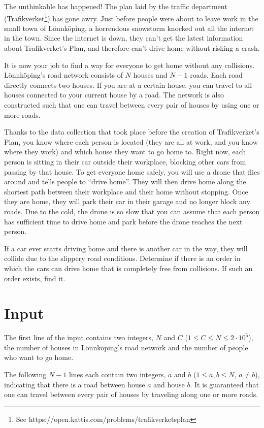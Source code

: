 \noindent
The unthinkable has happened! The plan laid by the traffic department (Trafikverket\footnote{See https://open.kattis.com/problems/trafikverketsplan}) has gone awry. Just before people were about to leave work in the small town of Lönnköping,
a horrendous snowstorm knocked out all the internet in the town. Since the internet is down, they can't get the latest
information about Trafikverket's Plan, and therefore can't drive home without risking a crash.

It is now your job to find a way for everyone to get home without any collisions. Lönnköping's road network consists
of $N$ houses and $N-1$ roads. Each road directly connects two houses. If you are at a certain house, you can
travel to all houses connected to your current house by a road. The network is also constructed such that one can
travel between every pair of houses by using one or more roads.

Thanks to the data collection that took place before the creation of Trafikverket's Plan, you know where each person
is located (they are all at work, and you know where they work) and which house they want to go home to.
Right now, each person is sitting in their car outside their workplace, blocking other cars from passing by that house.
To get everyone home safely, you will use a drone that flies around and tells people to ``drive home''. They will then
drive home along the shortest path between their workplace and their home without stopping. Once they are home,
they will park their car in their garage and no longer block any roads. Due to the cold, the drone is so slow
that you can assume that each person has sufficient time to drive home and park before the drone reaches the next person.

If a car ever starts driving home and there is another car in the way, they will collide due to the slippery road conditions.
Determine if there is an order in which the cars can drive home that is completely free from collisions.
If such an order exists, find it.

\section*{Input}
The first line of the input contains two integers, $N$ and $C$ ($1 \le C \leq N \le 2 \cdot 10^5$), the number of houses
in Lönnköping's road network and the number of people who want to go home.

The following $N-1$ lines each contain two integers, $a$ and $b$ ($1 \leq a,b \leq N$, $a \neq b$), indicating that there
is a road between house $a$ and house $b$. It is guaranteed that one can travel between every pair of houses by traveling
along one or more roads.

